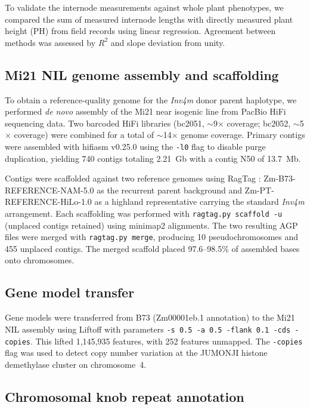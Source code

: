 \documentclass[9pt,twocolumn,twoside]{rilabRxiv}
\newcommand{\invfour}{\textit{Inv4m}\xspace}
\begin{document}
To validate the internode measurements against whole plant phenotypes, we compared the sum of measured internode lengths with directly measured plant height (PH) from field records using linear regression.
Agreement between methods was assessed by $R^2$ and slope deviation from unity.

\subsection{Mi21 NIL genome assembly and scaffolding}

To obtain a reference-quality genome for the \invfour donor parent haplotype, we performed \textit{de novo} assembly of the Mi21 near isogenic line from PacBio HiFi sequencing data.
Two barcoded HiFi libraries (bc2051, $\sim$9$\times$ coverage; bc2052, $\sim$5$\times$ coverage) were combined for a total of $\sim$14$\times$ genome coverage.
Primary contigs were assembled with hifiasm v0.25.0 \cite{cheng2021hifiasm} using the \texttt{-l0} flag to disable purge duplication, yielding 740 contigs totaling 2.21~Gb with a contig N50 of 13.7~Mb.

Contigs were scaffolded against two reference genomes using RagTag \cite{alonge2022}: Zm-B73-REFERENCE-NAM-5.0 \cite{hufford2021} as the recurrent parent background and Zm-PT-REFERENCE-HiLo-1.0 as a highland representative carrying the standard \invfour arrangement.
Each scaffolding was performed with \texttt{ragtag.py scaffold -u} (unplaced contigs retained) using minimap2 \cite{li2018minimap2} alignments.
The two resulting AGP files were merged with \texttt{ragtag.py merge}, producing 10 pseudochromosomes and 455 unplaced contigs.
The merged scaffold placed 97.6--98.5\% of assembled bases onto chromosomes.

\subsection{Gene model transfer}

Gene models were transferred from B73 (Zm00001eb.1 annotation) to the Mi21 NIL assembly using Liftoff \cite{shumate2021} with parameters \texttt{-s~0.5 -a~0.5 -flank~0.1 -cds -copies}.
This lifted 1,145,935 features, with 252 features unmapped.
The \texttt{-copies} flag was used to detect copy number variation at the JUMONJI histone demethylase cluster on chromosome~4.

\subsection{Chromosomal knob repeat annotation}
\end{document}
